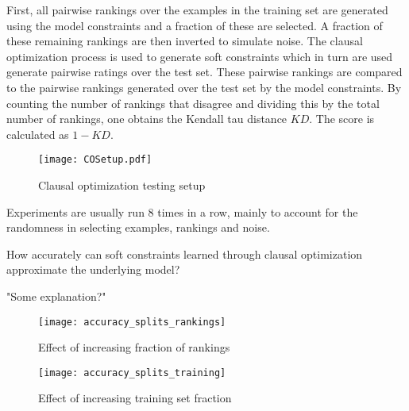First, all pairwise rankings over the examples in the training set are generated using the model constraints and a fraction of these are selected.
A fraction of these remaining rankings are then inverted to simulate noise.
The clausal optimization process is used to generate soft constraints which in turn are used generate pairwise ratings over the test set.
These pairwise rankings are compared to the pairwise rankings generated over the test set by the model constraints.
By counting the number of rankings that disagree and dividing this by the total number of rankings, one obtains the Kendall tau distance $\mathit{KD}$.
The score is calculated as $1 - \mathit{KD}$.

\begin{figure}

	\caption{Clausal optimization testing setup}
	\centering
		\texttt{[image: COSetup.pdf]}
	\label{fig:co_test_setup}

\end{figure}

Experiments are usually run $8$ times in a row, mainly to account for the randomness in selecting examples, rankings and noise.

\begin{question}
	How accurately can soft constraints learned through clausal optimization approximate the underlying model?
\end{question}

\begin{experiment}

		"Some explanation?"
		\begin{figure}

		\caption{Effect of increasing fraction of rankings}
		\centering
			\texttt{[image: accuracy\_splits\_rankings]}
		\label{fig:accuracy_splits_rankings}

	\end{figure}

	\begin{figure}

		\caption{Effect of increasing training set fraction}
		\centering
			\texttt{[image: accuracy\_splits\_training]}
		\label{fig:accuracy_splits_training}

	\end{figure}

\end{experiment}

